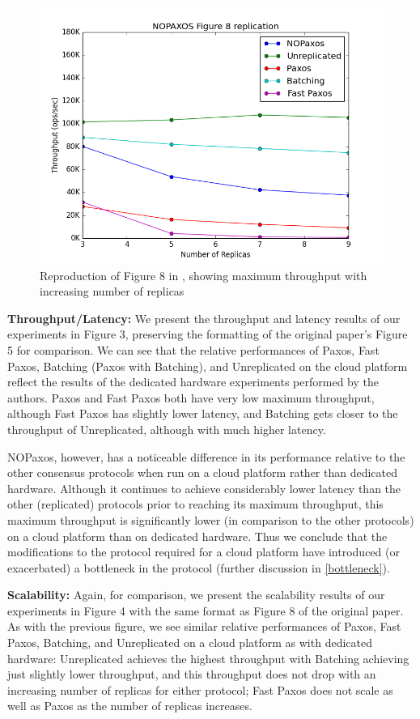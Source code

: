 \begin{figure}[tp]
\centering
\includegraphics[scale=0.5]{figures/Figure8.png}
\caption{Reproduction of Figure 8 in \cite{nopaxos}, showing maximum throughput with increasing number of replicas}
\end{figure}

\textbf{Throughput/Latency: }We present the throughput and latency results of our experiments in Figure 3, preserving the formatting of the original paper's Figure 5 for comparison. We can see that the relative performances of Paxos, Fast Paxos, Batching (Paxos with Batching), and Unreplicated on the cloud platform reflect the results of the dedicated hardware experiments performed by the authors. Paxos and Fast Paxos both have very low maximum throughput, although Fast Paxos has slightly lower latency, and Batching gets closer to the throughput of Unreplicated, although with much higher latency.

NOPaxos, however, has a noticeable difference in its performance relative to the other consensus protocols when run on a cloud platform rather than dedicated hardware. Although it continues to achieve considerably lower latency than the other (replicated) protocols prior to reaching its maximum throughput, this maximum throughput is significantly lower (in comparison to the other protocols) on a cloud platform than on dedicated hardware. Thus we conclude that the modifications to the protocol required for a cloud platform have introduced (or exacerbated) a bottleneck in the protocol (further discussion in \ref{bottleneck}). 

\textbf{Scalability: }Again, for comparison, we present the scalability results of our experiments in Figure 4 with the same format as Figure 8 of the original paper. As with the previous figure, we see similar relative performances of Paxos, Fast Paxos, Batching, and Unreplicated on a cloud platform as with dedicated hardware: Unreplicated achieves the highest throughput with Batching achieving just slightly lower throughput, and this throughput does not drop with an increasing number of replicas for either protocol; Fast Paxos does not scale as well as Paxos as the number of replicas increases.

